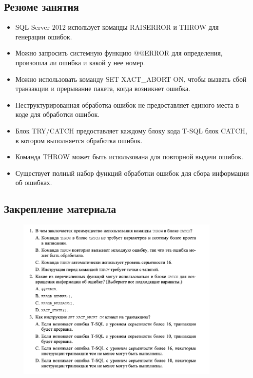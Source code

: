 \subsection*{Резюме занятия}
\begin{itemize}
\item SQL Server 2012 использует команды RAISERROR и THROW для генерации ошибок. 
\item Можно запросить системную функцию @@ERROR для определения, произошла ли ошибка и какой у нее номер. 
\item Можно использовать команду SET XACT\_ABORT ON, чтобы вызвать сбой транзакции и прерывание пакета, когда возникнет ошибка. 
\item Неструктурированная обработка ошибок не предоставляет единого места в коде для обработки ошибок. 
\item Блок TRY/CATCH предоставляет каждому блоку кода T-SQL блок CATCH, в котором выполняется обработка ошибок. 
\item Команда THROW может быть использована для повторной выдачи ошибок. 
\item Существует полный набор функций обработки ошибок для сбора информации об ошибках. 
\end{itemize}

\subsection*{Закрепление материала}

\begin{figure}[h!]
	\begin{center}
		\includegraphics[width=0.9\textwidth]{img/zakrep27.png}
	\end{center}
	\captionsetup{justification=centering}
\end{figure}
\clearpage

